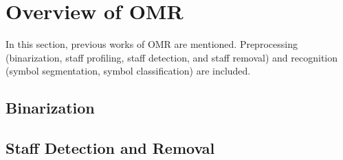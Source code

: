 \chapter{Overview of OMR}
\label{c:overveiw-of-omr}

In this section, previous works of OMR are mentioned. Preprocessing (binarization, staff profiling, staff detection, and staff removal) and recognition (symbol segmentation, symbol classification) are included. 

\section{Binarization}


\section{Staff Detection and Removal}


